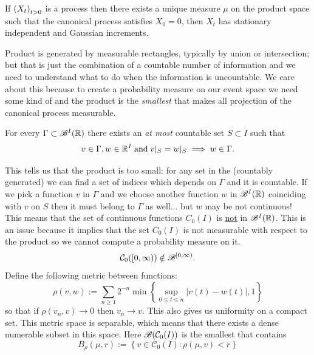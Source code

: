 \documentclass[12pt]{report}
\begin{document}
\begin{corollary}
	If ${\left({X}_{t}\right)}_{t>0}$ is a process then there exists a unique measure $\mu$ on the product space such that the canonical process satisfies $X_{0}=0$, then $X_{t}$ has stationary independent and Gaussian increments.
\end{corollary}
Product \sa{} is generated by measurable rectangles, typically by union or intersection; but that is just the combination of a countable number of information and we need to understand what to do when the information is uncountable. We care about this because to create a probability measure on our event space we need some kind of \sa{} and the product \sa{} is the \emph{smallest \sa{}} that makes all projection of the canonical process measurable.
\begin{theorem}
	For every $\Gamma\subset \mathscr{B}^{I}(\mathbb{R})$ there exists an \textit{at most} countable set $S\subset I$ such that 
	\begin{equation*}
		v\in\Gamma,w\in\mathbb{R}^{I}\;\text{and}\;v|_{S}=w|_{S}\implies w\in\Gamma.
	\end{equation*}
\end{theorem}
This tells us that the product \sa{} is too small: for any set in the \sa{} (countably generated) we can find a set of indices which depends on $\Gamma$ and it is countable. If we pick a function  $v$ in $\Gamma$ and we choose another function $w$ in $\mathscr{B}^{I}(\mathbb{R})$ coinciding with $v$ on $S$ then it must belong to $\Gamma$ as well... but $w$ may be not continuous! This means that the set of continuous functions $C_{0}(I)$ is \underline{not} in $\mathscr{B}^{I}(\mathbb{R})$. This is an issue because it implies that the set $C_{0}(I)$ is not measurable with respect to the product \sa{} so we cannot compute a probability measure on it.
\begin{equation*}
	\mathcal{C}_{0}([0,\infty))\notin\mathscr{B}^{[0,\infty)}.
\end{equation*}
Define the following metric between functions:
\begin{equation*}
	\rho(v,w):=\sum_{n\geq1}2^{-n}\min\left\{\sup_{0\leq t\leq n}|v(t)-w(t)|,1\right\}
\end{equation*}
so that if $\rho(v_{n},v)\to0$ then $v_{n}\to v$. This also gives us uniformity on a compact set. This metric space is separable, which means that there exists a dense numerable subset in this space. Here $\mathscr{B}(\mathcal{C}_{0}(I))$ is the smallest that contains
\begin{equation*}
	B_{\rho}(\mu,r):=\left\{v\in\mathcal{C}_{0}(I):\rho(\mu,v)< r\right\}
\end{equation*}
\end{document}
